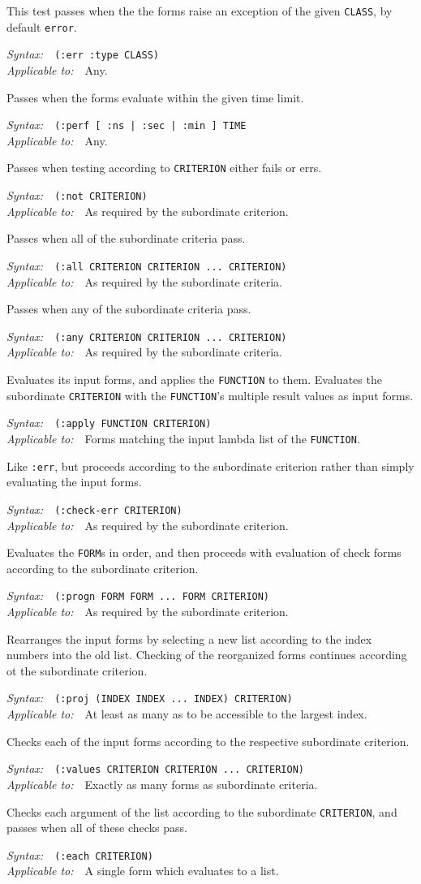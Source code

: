 \documentclass{article}
\newenvironment{criteria}%
{\begin{list}{}
    {\setlength{\labelwidth}{0pt}
     \setlength{\leftmargin}{2em}
     \setlength{\rightmargin}{1em}
     \setlength{\itemindent}{0em}}}%
  {\end{list}}
\def\criterion#1#2#3#4{\item[\bfseries #1] #4\par
  \emph{Syntax:}~~\texttt{#2}\\ \emph{Applicable to:}~~#3}
\begin{document}
\begin{criteria}
  \criterion{:err}{(:err :type CLASS)}{Any.}{This test passes when the
    the forms raise an exception of the given \texttt{CLASS}, by
    default \texttt{error}.}

  \criterion{:perf}{(:perf [ :ns | :sec | :min ] TIME}{Any.}{Passes
    when the forms evaluate within the given time limit.}

  \criterion{:not}{(:not CRITERION)}{As required by the subordinate
    criterion.}{Passes when testing according to \texttt{CRITERION}
    either fails or errs.}

  \criterion{:all}{(:all CRITERION CRITERION ...\ CRITERION)}{As
    required by the subordinate criteria.}{Passes when all of the
    subordinate criteria pass.}

  \criterion{:any}{(:any CRITERION CRITERION ...\ CRITERION)}{As
    required by the subordinate criteria.}{Passes when any of the
    subordinate criteria pass.}

  \criterion{:apply}{(:apply FUNCTION CRITERION)}{Forms matching the
    input lambda list of the \texttt{FUNCTION}.}{Evaluates its input
    forms, and applies the \texttt{FUNCTION} to them.  Evaluates the
    subordinate \texttt{CRITERION} with the \texttt{FUNCTION}'s
    multiple result values as input forms.}

  \criterion{:check-err}{(:check-err CRITERION)}{As required by the
    subordinate criterion.}{Like \texttt{:err}, but proceeds according
    to the subordinate criterion rather than simply evaluating the
    input forms.}

  \criterion{:progn}{(:progn FORM FORM ...\ FORM CRITERION)}{As
    required by the subordinate criterion.}{Evaluates the
    \texttt{FORM}s in order, and then proceeds with evaluation of
    check forms according to the subordinate criterion.}

  \criterion{:proj}{(:proj (INDEX INDEX ...\ INDEX) CRITERION)}{At
    least as many as to be accessible to the largest
    index.}{Rearranges the input forms by selecting a new list
    according to the index numbers into the old list.  Checking of the
    reorganized forms continues according ot the subordinate
    criterion.}

  \criterion{:values}{(:values CRITERION CRITERION ...\
    CRITERION)}{Exactly as many forms as subordinate criteria.}{Checks
    each of the input forms according to the respective subordinate
    criterion.}

  \criterion{:each}{(:each CRITERION)}{A single form which evaluates
    to a list.}{Checks each argument of the list according to the
    subordinate \texttt{CRITERION}, and passes when all of these
    checks pass.}


\end{criteria}
\end{document}
